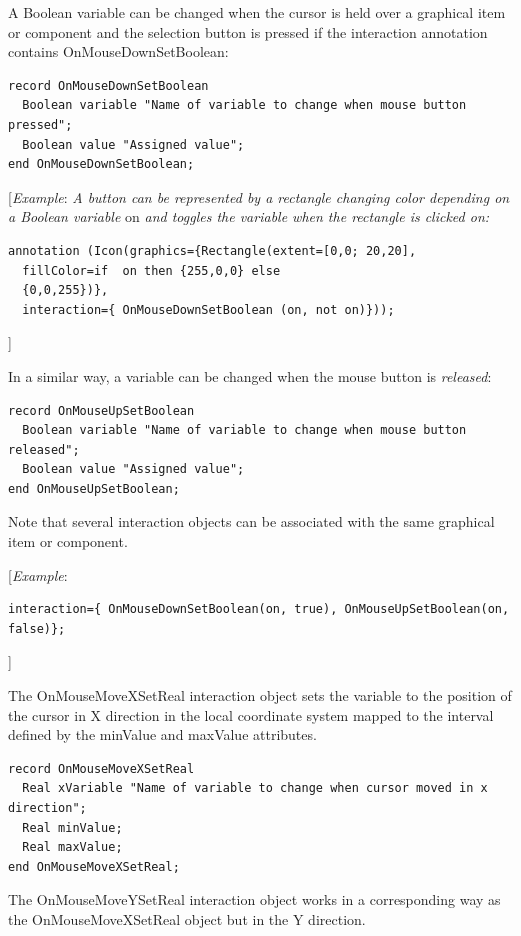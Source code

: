 \documentclass[10pt,a4paper]{report}
\begin{document}
A Boolean variable can be changed when the cursor is held over a
graphical item or component and the selection button is pressed if the
interaction annotation contains OnMouseDownSetBoolean:

\begin{lstlisting}[language=modelica]
record OnMouseDownSetBoolean
  Boolean variable "Name of variable to change when mouse button pressed";
  Boolean value "Assigned value";
end OnMouseDownSetBoolean;
\end{lstlisting}
{[}\emph{Example}: \emph{A button can be represented by a rectangle
changing color depending on a Boolean variable} on \emph{and toggles the
variable when the rectangle is clicked on:}

\begin{lstlisting}[language=modelica]
  annotation (Icon(graphics={Rectangle(extent=[0,0; 20,20],
  fillColor=if  on then {255,0,0} else
  {0,0,255})},
  interaction={ OnMouseDownSetBoolean (on, not on)}));
\end{lstlisting}
{]}

In a similar way, a variable can be changed when the mouse button is
\emph{released}:

\begin{lstlisting}[language=modelica]
record OnMouseUpSetBoolean
  Boolean variable "Name of variable to change when mouse button released";
  Boolean value "Assigned value";
end OnMouseUpSetBoolean;
\end{lstlisting}
Note that several interaction objects can be associated with the same
graphical item or component.

{[}\emph{Example}:
\begin{lstlisting}[language=modelica]
interaction={ OnMouseDownSetBoolean(on, true), OnMouseUpSetBoolean(on, false)};
\end{lstlisting}
{]}

The OnMouseMoveXSetReal interaction object sets the variable to the
position of the cursor in X direction in the local coordinate system
mapped to the interval defined by the minValue and maxValue attributes.

\begin{lstlisting}[language=modelica]
record OnMouseMoveXSetReal
  Real xVariable "Name of variable to change when cursor moved in x direction";
  Real minValue;
  Real maxValue;
end OnMouseMoveXSetReal;
\end{lstlisting}
The OnMouseMoveYSetReal interaction object works in a corresponding way
as the OnMouseMoveXSetReal object but in the Y direction.
\end{document}
